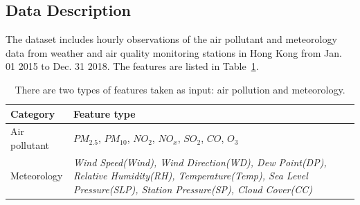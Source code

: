 



\subsection{Data Description}
\label{section:datadescription}

The dataset includes hourly observations of the air pollutant and meteorology data from weather and air quality monitoring stations in Hong Kong from Jan. 01 2015 to Dec. 31 2018.
The features are listed in Table~\ref{table:feature_list}.

\begin{table}[h!]
\centering
\caption{There are two types of features taken as input: air pollution and meteorology. }
\begin{tabular}{|p{2cm}|p{5.2cm}|} 
\hline
 Category & Feature type \\ [0.5ex] 
\hline
    Air pollutant&$PM_{2.5}$, $PM_{10}$, $NO_{2}$, $NO_{x}$, $SO_{2}$, $CO$, $O_3$\\[0.4ex] 
\hline
    Meteorology&\textit{Wind Speed(Wind), Wind Direction(WD), Dew Point(DP), Relative Humidity(RH), Temperature(Temp), Sea Level Pressure(SLP), Station Pressure(SP), Cloud Cover(CC)}\\
\hline
\end{tabular}
\label{table:feature_list}
\end{table}

